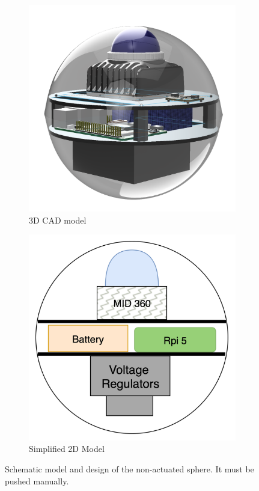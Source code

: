 \documentclass[a4paper, conference]{IEEEtran}
\begin{document}
\begin{figure}
\centering
\begin{subfigure}{0.4\columnwidth}
    \centering
    \includegraphics[width=\textwidth]{pics/Non_actuated_Sphere_CAD.png}
    \caption{3D CAD model}
    \label{fig:cad-model}
\end{subfigure}
\hfill
\begin{subfigure}{0.4\columnwidth}
    \centering
    \includegraphics[width=\textwidth]{pics/image.png}
    \caption{Simplified 2D Model}
    \label{fig:2d-model}
\end{subfigure}
\caption{Schematic model and design of the non-actuated sphere.
It must be pushed manually.}
\label{fig:cad-design1}
\end{figure}
\end{document}

